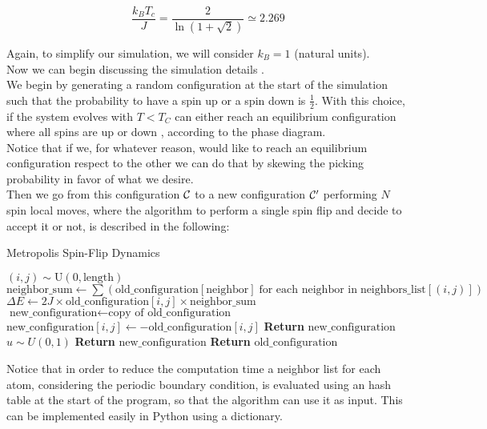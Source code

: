 $$ \frac{k_BT_c}{J} = \frac{2}{\ln(1 +\sqrt{2})} \simeq 2.269 $$

Again, to simplify our simulation, we will consider $k_B = 1$ (natural units). \\

Now we can begin discussing the simulation details .\\
We begin by generating a random configuration at the start of the simulation such that the probability to have a spin up or a spin down is
$\frac{1}{2}$. With this choice, if the system evolves with $T<T_C$ can either reach an equilibrium configuration where all spins are up or down ,
according to the phase diagram. \\
Notice that if we, for whatever reason, would like to reach an equilibrium configuration respect to the other we can do that by skewing
the picking probability in favor of what we desire. \\
Then we go from this configuration $\mathcal{C}$ to a new configuration $\mathcal{C}'$ performing $N$ spin local moves, 
where the algorithm to perform a single spin flip and decide to accept it or not, is described in the following:

\begin{algorithm}
    \caption{Metropolis Spin-Flip Dynamics}
    \begin{algorithmic}[1]
        \State \((i, j) \sim \text{U}(0, \text{length})\)
        \State \(\text{neighbor\_sum} \gets \sum \left( \text{old\_configuration}[\text{neighbor}] \; \text{for each neighbor in} \; \text{neighbors\_list}[(i, j)] \right)\)
        \State \(\Delta E \gets 2J \times \text{old\_configuration}[i, j] \times \text{neighbor\_sum}\)
        \State \(\text{new\_configuration} \gets \text{copy of old\_configuration}\)
        \State \(\text{new\_configuration}[i, j] \gets -\text{old\_configuration}[i, j]\) 
            \State \textbf{Return} \(\text{new\_configuration}\)
        \Else
            \State \(u \sim U(0,1)\)
                \State \textbf{Return} \(\text{new\_configuration}\)
            \Else
                \State \textbf{Return} \(\text{old\_configuration}\)
            \EndIf
        \EndIf
    \end{algorithmic}
    \label{metropolis_spin_flip}
\end{algorithm}

Notice that in order to reduce the computation time a neighbor list for each atom, considering the periodic boundary condition, 
is evaluated using an hash table at the start of the program, so that the algorithm can use it as input. This can be implemented
 easily in Python using a dictionary.
